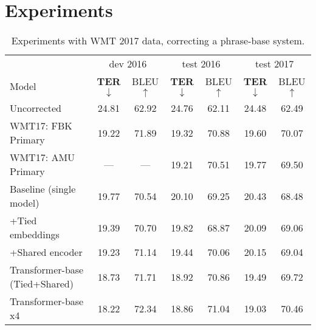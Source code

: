 \documentclass[11pt,a4paper]{article}
\begin{document}


\section{Experiments}

\begin{table*}[t]
\centering
\begin{tabular}{p{5.5cm}cccccc}
\toprule
& \multicolumn{2}{c}{dev 2016} & \multicolumn{2}{c}{test 2016} & \multicolumn{2}{c}{test 2017}\\
Model & \textbf{TER$\downarrow$} & BLEU$\uparrow$ & \textbf{TER$\downarrow$} & BLEU$\uparrow$ & \textbf{TER$\downarrow$} & BLEU$\uparrow$ \\
\midrule
Uncorrected & 24.81 & 62.92 & 24.76 & 62.11 & 24.48 & 62.49 \\

\midrule
WMT17: FBK Primary & 19.22 & 71.89 & 19.32 & 70.88 & 19.60 & 70.07 \\
WMT17: AMU Primary &   --- &   --- & 19.21 & 70.51 & 19.77 & 69.50 \\

\midrule
Baseline (single model) & 19.77 & 70.54 & 20.10 & 69.25 & 20.43	 & 68.48 \\
\quad +Tied embeddings & 19.39 & 70.70 & 19.82 & 68.87 & 20.09 & 69.06 \\
\quad +Shared encoder & 19.23 & 71.14 & 19.44 & 70.06 & 20.15 & 69.04 \\ \midrule
Transformer-base (Tied+Shared) & 18.73 & 71.71 & 18.92 & 70.86 & 19.49 & 69.72 \\ 
Transformer-base x4 & 18.22 & 72.34 & 18.86 & 71.04 & 19.03 & 70.46 \\

\bottomrule
\end{tabular}
\caption{Experiments with WMT 2017 data, correcting a phrase-base system.}\label{tab:results}
\end{table*}
\end{document}
